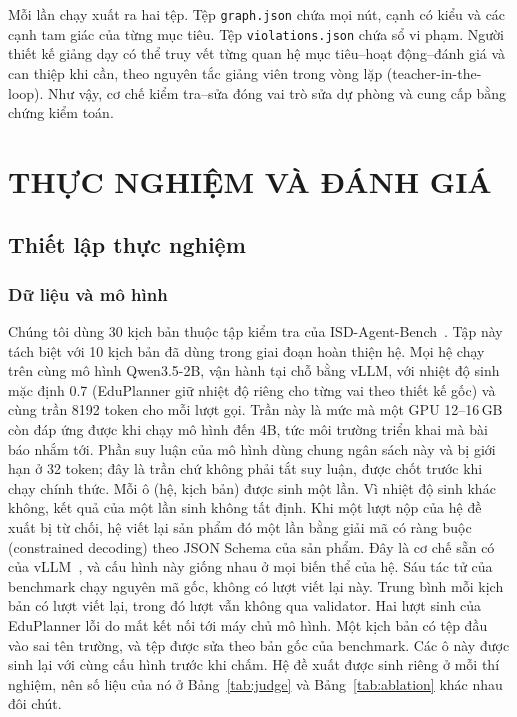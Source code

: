 \documentclass[conference,a4paper]{IEEEtran}
\begin{document}
Mỗi lần chạy xuất ra hai tệp. Tệp \texttt{graph.json} chứa mọi nút, cạnh có kiểu
và các cạnh tam giác của từng mục tiêu. Tệp \texttt{violations.json} chứa sổ vi
phạm. Người thiết kế giảng dạy có thể truy vết từng quan hệ
mục tiêu--hoạt động--đánh giá và can thiệp khi cần, theo nguyên tắc giảng viên
trong vòng lặp (teacher-in-the-loop). Như vậy, cơ chế kiểm tra--sửa đóng vai trò sửa dự phòng và cung cấp bằng chứng kiểm toán.

\section{THỰC NGHIỆM VÀ ĐÁNH GIÁ}
\label{sec:experiments}

\subsection{Thiết lập thực nghiệm}
\label{sec:setup}

\subsubsection{Dữ liệu và mô hình}
Chúng tôi dùng 30 kịch bản thuộc tập kiểm tra của
ISD-Agent-Bench~\cite{isdagentbench}. Tập này tách biệt với 10 kịch bản đã dùng trong giai đoạn hoàn thiện hệ. Mọi hệ chạy trên cùng mô hình Qwen3.5-2B, vận hành tại chỗ bằng vLLM, với nhiệt độ sinh mặc định 0.7 (EduPlanner giữ nhiệt độ riêng cho từng vai theo thiết kế gốc) và cùng trần 8192 token cho mỗi lượt gọi. Trần này là mức mà một GPU
12--16\,GB còn đáp ứng được khi chạy mô hình đến 4B, tức môi trường triển khai mà bài báo nhắm tới. Phần suy luận của mô hình dùng chung ngân sách này và bị giới hạn ở 32 token; đây là trần chứ không phải tắt suy luận, được chốt trước khi chạy chính thức. Mỗi ô (hệ, kịch bản)
được sinh một lần. Vì nhiệt độ sinh khác không, kết quả của một lần sinh
không tất định. Khi một lượt nộp của hệ đề xuất bị từ chối, hệ viết lại sản phẩm
đó một lần bằng giải mã có ràng buộc (constrained decoding) theo JSON Schema của
sản phẩm. Đây là cơ chế sẵn có của vLLM~\cite{kwon2023vllm}, và cấu hình này giống nhau ở mọi
biến thể của hệ. Sáu tác tử của benchmark chạy nguyên mã gốc, không có lượt viết lại
này. Trung bình mỗi kịch bản có \CPass{} lượt viết lại, trong đó \CPassRej{} lượt vẫn
không qua validator. Hai lượt sinh của EduPlanner lỗi do mất kết nối tới máy chủ mô hình. Một kịch bản có tệp đầu vào sai tên trường, và tệp được sửa theo bản gốc của benchmark. Các ô này được sinh lại với cùng cấu hình trước khi chấm. Hệ đề xuất được sinh riêng ở mỗi thí nghiệm, nên số liệu của nó ở Bảng~\ref{tab:judge} và Bảng~\ref{tab:ablation} khác nhau đôi chút.
\end{document}
